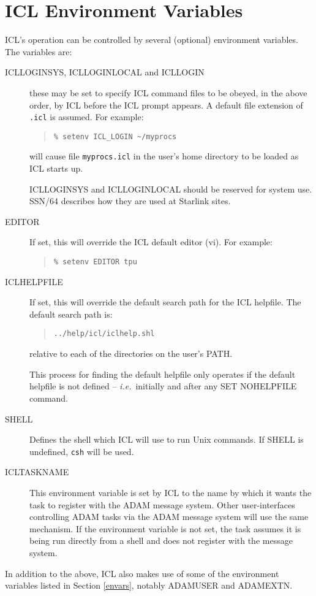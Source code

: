 \documentclass[twoside,11pt]{article}
\newcommand{\xref}[3]{#1}
\newcommand{\xlabel}[1]{}
\renewcommand{\_}{\texttt{\symbol{95}}}
\begin{document}
\section{\xlabel{icl_environment_variables}\label{iclvars}ICL Environment Variables}
ICL's operation can be controlled by several (optional) environment
variables. The variables are:
\begin{description}
\item[ICL\_LOGIN\_SYS, ICL\_LOGIN\_LOCAL and ICL\_LOGIN]
these may be set to specify ICL command files to be obeyed, 
in the above order, by ICL before the ICL prompt appears.
A default file extension of \texttt{.icl} is assumed. For example:
\begin{quote} \begin{verbatim}
% setenv ICL_LOGIN ~/myprocs
\end{verbatim} \end{quote}
will cause file \texttt{myprocs.icl} in the user's home directory to be loaded
as ICL starts up.

ICL\_LOGIN\_SYS and ICL\_LOGIN\_LOCAL should be reserved for system use.
\xref{SSN/64}{ssn64}{} 
describes how they are used at Starlink sites.
\item[EDITOR] If set, this will override the ICL default editor (vi). 
For example:
\begin{quote} \begin{verbatim}
% setenv EDITOR tpu
\end{verbatim} \end{quote}
\item[ICL\_HELPFILE] If set, this will override the default search path for the
ICL helpfile. The default search path is:
\begin{quote} \begin{verbatim}
../help/icl/iclhelp.shl
\end{verbatim} \end{quote}
relative to each of the directories on the user's PATH.

This process for finding the default helpfile only operates if the default
helpfile is not defined -- \textit{i.e.}\ initially and after any 
SET NOHELPFILE command.
\item[SHELL] Defines the shell which ICL will use to run Unix commands.
If SHELL is undefined, \texttt{csh} will be used.
\item[ICL\_TASK\_NAME] This environment variable is set by ICL to the name
by which it wants the task to register with the ADAM message system. Other
user-interfaces controlling ADAM tasks via the ADAM message system will use the
same mechanism. If the environment variable is not set, the task assumes it
is being run directly from a shell and does not register with the message 
system.
\end{description}
In addition to the above, ICL also makes use of some of the environment 
variables listed in Section \ref{envars}, notably ADAM\_USER and ADAM\_EXTN.
\end{document}
